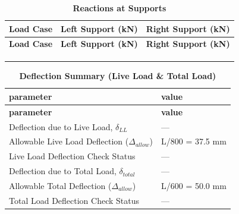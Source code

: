 \documentclass[12pt,a4paper]{report}
\numberwithin{table}{chapter}
\numberwithin{figure}{chapter}
\begin{document}
\endgroup

\vspace{1em}
\begin{longtable}{|>{\centering\arraybackslash}p{5.2cm}|>{\centering\arraybackslash}p{5.2cm}|>{\centering\arraybackslash}p{5.2cm}|}
\caption{\textbf{Reactions at Supports}}
\hline
\rowcolor{tableHead} \textbf{Load Case} & \textbf{Left Support (kN)} & \textbf{Right Support (kN)} \\[6pt]
\hline
\endfirsthead
\hline
\rowcolor{tableHead} \textbf{Load Case} & \textbf{Left Support (kN)} & \textbf{Right Support (kN)} \\[6pt]
\hline
\endhead
 &  &  \\[6pt]
\hline
 &  &  \\[6pt]
\hline
 &  &  \\[6pt]
\hline
\end{longtable}

\vspace{1em}
\begin{longtable}{|L{7cm}|p{8.5cm}|}
\caption{\textbf{Deflection Summary (Live Load \& Total Load)}}
\hline
{} \textbf{parameter} & \textbf{value} \\
\hline
\endfirsthead
\hline
{} \textbf{parameter} & \textbf{value} \\
\hline
\endhead
\textnormal{Deflection due to Live Load, $\delta_{LL}$} & --- \\[6pt]
\hline
\textnormal{Allowable Live Load Deflection ($\Delta_{allow}$)} & L/800 = 37.5 mm \\[6pt]
\hline
\textnormal{Live Load Deflection Check Status} & --- \\[6pt]
\hline
\textnormal{Deflection due to Total Load, $\delta_{total}$} & --- \\[6pt]
\hline
\textnormal{Allowable Total Deflection ($\Delta_{allow}$)} & L/600 = 50.0 mm \\[6pt]
\hline
\textnormal{Total Load Deflection Check Status} & --- \\[6pt]
\hline
\end{longtable}

\vspace{1em}
\noindent
\noindent{}
\noindent{}
\noindent{}
\end{document}
